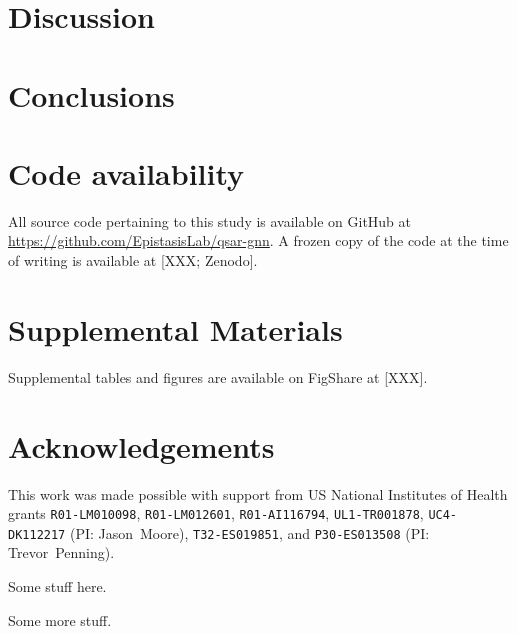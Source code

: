 \documentclass{ws-procs11x85}
\begin{document}
\section{Discussion}

\section{Conclusions}

\section{Code availability}
All source code pertaining to this study is available on GitHub at \url{https://github.com/EpistasisLab/qsar-gnn}.
A frozen copy of the code at the time of writing is available at [XXX; Zenodo].

\section{Supplemental Materials}
Supplemental tables and figures are available on FigShare at [XXX].

\section*{Acknowledgements}
This work was made possible with support from US National Institutes of Health grants \texttt{R01-LM010098}, \texttt{R01-LM012601}, \texttt{R01-AI116794}, \texttt{UL1-TR001878}, \texttt{UC4-DK112217} (PI: Jason~Moore), \texttt{T32-ES019851}, and \texttt{P30-ES013508} (PI: Trevor~Penning).




\label{GCNN}
Some stuff here.

\label{NC}
Some more stuff.
\end{document}
